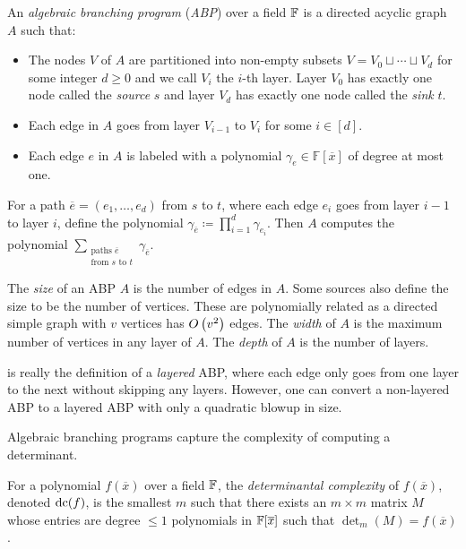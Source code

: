 \documentclass[letterpaper, 11pt]{amsart}
\begin{document}
\begin{defn}\label{defn:abp}
  An \emph{algebraic branching program} (\emph{ABP}) over a field $\mathbb{F}$ is a directed acyclic graph $A$ such that:
  \begin{itemize}
  \item The nodes $V$ of $A$ are partitioned into non-empty subsets $V = V_0 \sqcup \cdots \sqcup V_d$ for some integer $d\geq 0$ and we call $V_i$ the $i$-th layer.
        Layer $V_0$ has exactly one node called the \emph{source} $s$ and layer $V_d$ has exactly one node called the \emph{sink} $t$.
  \item Each edge in $A$ goes from layer $V_{i-1}$ to $V_i$ for some $i \in [d]$.
  \item Each edge $e$ in $A$ is labeled with a polynomial $\gamma_e \in \mathbb{F}[\overline{x}]$ of degree at most one.
  \end{itemize}
  For a path $\overline{e} = (e_1, \ldots, e_d)$ from $s$ to $t$, where each edge $e_i$ goes from layer $i - 1$ to layer $i$, define the polynomial $\gamma_{\overline{e}} \coloneqq \prod_{i = 1}^d \gamma_{e_i}$.
  Then $A$ computes the polynomial $\sum_{\substack{\text{paths } \overline{e} \\ \text{from } s \text{ to } t}} \gamma_{\overline{e}}$.

  The \emph{size} of an ABP $A$ is the number of edges in $A$.
  Some sources also define the size to be the number of vertices.
  These are polynomially related as a directed simple graph with $v$ vertices has $O\kern-0.0pt\left(v^2\right)$ edges.
  The \emph{width} of $A$ is the maximum number of vertices in any layer of $A$.
  The \emph{depth} of $A$ is the number of layers.
\end{defn}

\begin{rmk}
   is really the definition of a \emph{layered} ABP, where each edge only goes from one layer to the next without skipping any layers.
  However, one can convert a non-layered ABP to a layered ABP with only a quadratic blowup in size.
\end{rmk}

Algebraic branching programs capture the complexity of computing a determinant.

\begin{defn}\label{defn:det_complexity}
  For a polynomial $f(\overline{x})$ over a field $\mathbb{F}$, the \emph{determinantal complexity} of $f(\overline{x})$, denoted $\operatorname{dc}(f)$, is the smallest $m$ such that there exists an $m \times m$ matrix $M$ whose entries are degree $\leq 1$ polynomials in $\mathbb{F}[\overline{x}]$ such that $\det_m(M) = f(\overline{x})$.
\end{defn}
\end{document}
